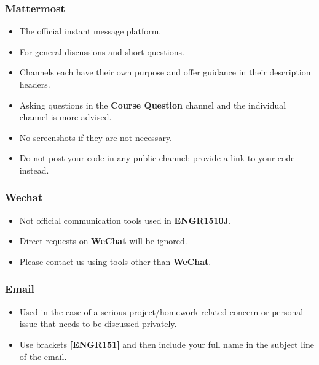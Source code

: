 \documentclass[
	11pt, %
]{beamer}
\begin{document}
\begin{frame}
	\frametitle{Mattermost}
 
	\begin{itemize}
    \item The official instant message platform.
    \item For general discussions and short questions.
    \item Channels each have their own purpose and offer guidance in their description headers.
    \item Asking questions in the \textbf{Course Question} channel and the individual channel is more advised.
    \item No screenshots if they are not necessary.
    \item Do not post your code in any public channel; provide a link to your code instead.
\end{itemize}

\end{frame}


\begin{frame}
	\frametitle{Wechat}
 
	\begin{itemize}
    \item Not official communication tools used in \textbf{ENGR1510J}.
    \item Direct requests on \textbf{WeChat} will be ignored.
    \item Please contact us using tools other than \textbf{WeChat}.
\end{itemize}

\end{frame}



\begin{frame}
	\frametitle{Email}
 
	\begin{itemize}
    \item Used in the case of a serious project/homework-related concern or personal issue that needs to be discussed privately.
    \item Use brackets \textbf{[ENGR151]} and then include your full name in the subject line of the email.
\end{itemize}

\end{frame}


\end{document}
